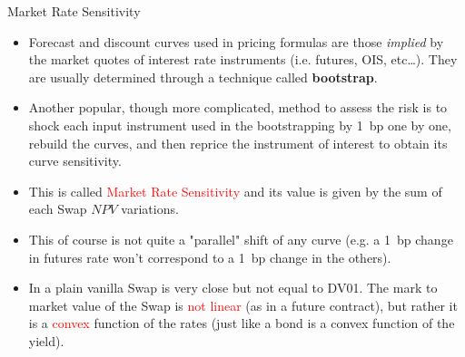 \documentclass{beamer}
\begin{document}
\begin{frame}{Market Rate Sensitivity}
\begin{itemize}
	\item<1-> Forecast and discount curves used in pricing formulas are those \emph{implied} by the market quotes of interest rate instruments (i.e. futures, OIS, etc\ldots). They are usually determined through a technique called \textbf{bootstrap}.
	\item<2-> Another popular, though more complicated, method to assess the risk is to shock each input instrument used in the bootstrapping by 1~bp one by one, rebuild the curves, and then reprice the instrument of interest to obtain its curve sensitivity. 
	\item<3-> This is called \textcolor{red}{Market Rate Sensitivity} and its value is given by the sum of each Swap $NPV$ variations.
	\item<4-> This of course is not quite a "parallel" shift of any curve (e.g. a 1~bp change in futures rate won't correspond to a 1~bp change in the others).
	\item<5-> In a plain vanilla Swap is very close but not equal to DV01. The mark to market value of the Swap is \textcolor{red}{not linear} (as in a future contract), but rather it is a \textcolor{red}{convex} function of the rates (just like a bond is a convex function of the yield).
\end{itemize}
\end{frame}
\end{document}
